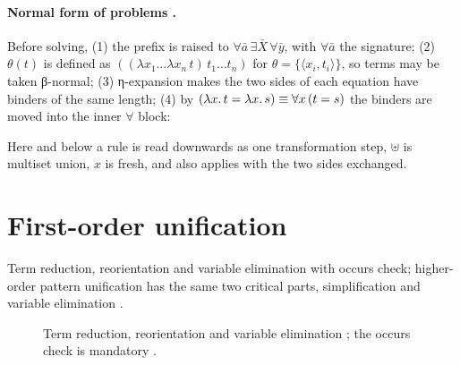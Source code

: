 \paragraph{Normal form of problems .} Before solving, (1) the prefix is raised to $\forall\bar a\,\exists\bar X\,\forall\bar y$, with $\forall\bar a$ the signature; (2) $\theta(t)$ is defined as $((\lambda x_1\dots\lambda x_n\,t)\,\allowbreak t_1\dots t_n)$ for $\theta=\{\langle x_i,t_i\rangle\}$, so terms may be taken β-normal; (3) η-expansion makes the two sides of each equation have binders of the same length; (4) by $(\lambda x.\,t=\lambda x.\,s)\equiv\forall x\,(t=s)$ the binders are moved into the inner $\forall$ block:
Here and below a rule is read downwards as one transformation step, $\uplus$ is multiset union, $x$ is fresh, and  also applies with the two sides exchanged.

\section{First-order unification}\label{sec:rules-fo}

Term reduction, reorientation and variable elimination with occurs check; higher-order pattern unification has the same two critical parts, simplification and variable elimination .

\begin{figure}[htbp]
\small
{}
\caption{Term reduction, reorientation and variable elimination ; the occurs check is mandatory .}\label{fig:rules-fo}
\end{figure}

